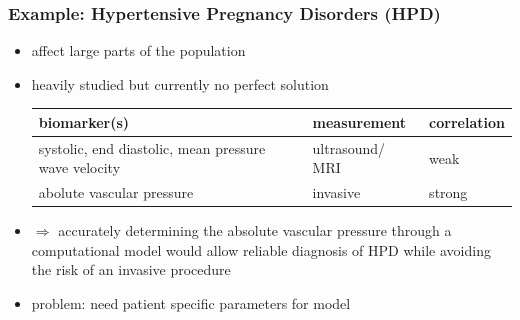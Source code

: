 \documentclass{beamer}
\begin{document}
\begin{frame}
	\frametitle{Example: Hypertensive Pregnancy Disorders (HPD)}
	\begin{itemize}
		\item affect large parts of the population
		\item heavily studied but currently no perfect solution 
			\begin{tabular}{| m{5cm} | m{2cm}| m{2cm} |  } 
				\hline
				biomarker(s) & measurement & correlation \\ 
				\hline
				\hline
				systolic, end diastolic, mean pressure wave velocity & ultrasound/ MRI & weak \\ 
				\hline
				abolute vascular pressure & invasive & strong \\ 
				\hline
			\end{tabular}
		\item
			$\Rightarrow$ accurately determining the absolute vascular pressure through a computational model would allow reliable diagnosis of HPD while avoiding the risk of an invasive procedure
		\item problem: need patient specific parameters for model
	\end{itemize}

\end{frame}
\end{document}
